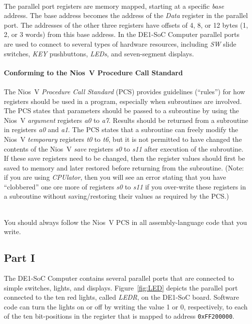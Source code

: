 \documentclass[epsfig,10pt,fullpage]{article}
\begin{document}
~\\
The parallel port registers are memory mapped, starting at a specific {\it base} address.
The base address becomes the address of the {\it Data} 
register in the parallel port. The addresses of the other three registers have offsets 
of 4, 8, or 12 bytes (1, 2, or 3 words) from this base address. In the DE1-SoC Computer parallel 
ports are used to connect to several types of hardware resources, including {\it SW} slide 
switches, {\it KEY} pushbuttons, {\it LEDs}, and seven-segment displays.
~\\
~\\
{\bf Conforming to the Nios~V Procedure Call Standard}
\\
\\
\noindent
The Nios~V {\it Procedure Call Standard} (PCS) provides guidelines (``rules'') for how registers
should be used in a program, especially when subroutines are involved. The PCS states that
parameters should be passed to a subroutine by using the Nios~V {\it argument} registers
{\it a0} to {\it a7}. Results should be returned from a subroutine in registers 
{\it a0} and {\it a1}. The PCS states that a subroutine can freely modify the Nios~V
{\it temporary} registers {\it t0} to {\it t6}, but it is not permitted to have changed the 
contents of the Nios~V {\it save} registers {\it s0} to {\it s11} after execution of the subroutine.
If these save registers need to be changed, then the register values should first be saved to
memory and later restored before returning from the subroutine. (Note: if you are using 
{\it CPUlator}, then you will see an error stating 
that you have ``clobbered'' one ore more of registers {\it s0} to {\it s11} if you over-write
these registers in a subroutine without saving/restoring their values as required by the PCS.)

~\\
\noindent
You should always follow the Nios~V PCS in all assembly-language code that you write.

\subsection*{Part I}

\noindent
The DE1-SoC Computer contains several parallel ports that are connected to simple switches,
lights, and displays. Figure~\ref{fig:LED} depicts the parallel port connected to the ten
red lights, called {\it LEDR}, on the DE1-SoC board. Software code can turn the lights on 
or off by writing the value 1 or 0, respectively, to each of the ten bit-positions in the 
register that is mapped to address \texttt{0xFF200000}. 
\end{document}
